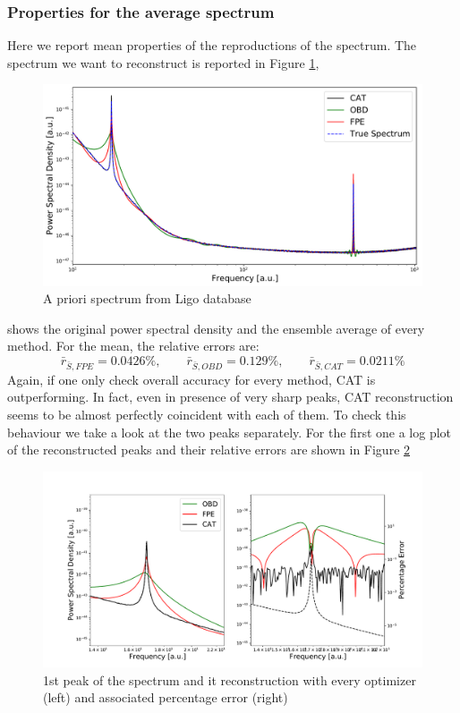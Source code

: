 \documentclass[twocolumn,showpacs,preprintnumbers,nofootinbib,prd,
superscriptaddress,10pt]{revtex4-1}
\begin{document}
\subsubsection{Properties for the average spectrum}
Here we report mean properties of the reproductions of the spectrum. The spectrum we want to reconstruct is reported in Figure \ref{fig:ligospectrum},
\begin{figure}
    \centering
  
        \includegraphics[width = \linewidth]{Images/LIGOsimulate/PSD.pdf}
        \caption{A priori spectrum from Ligo database}
        \label{fig:ligospectrum}
\end{figure}
shows the original power spectral density and the ensemble average of every method. For the mean, the relative errors are: 
\begin{equation}
    \bar r_{\bar S, FPE} = 0.0426\%, \qquad \bar r_{\bar S, OBD} = 0.129\%, \qquad \bar r_{\bar S, CAT} = 0.0211\%
\end{equation}
Again, if one only check overall accuracy for every method, CAT is outperforming. In fact, even in presence of very sharp peaks, CAT reconstruction seems to be almost perfectly coincident with each of them. To check this behaviour we take a look at the two peaks separately. For the first one a log plot of the reconstructed peaks and their relative errors are shown in Figure \ref{fig:ligo1peak} 
\begin{figure}[h]
        \includegraphics[width = \linewidth]{Images/LIGOsimulate/1stPeakComparison.pdf}
        \caption{1st peak of the spectrum and it reconstruction with every optimizer (left) and associated percentage error (right)}
        \label{fig:ligo1peak}
\end{figure}
\end{document}

